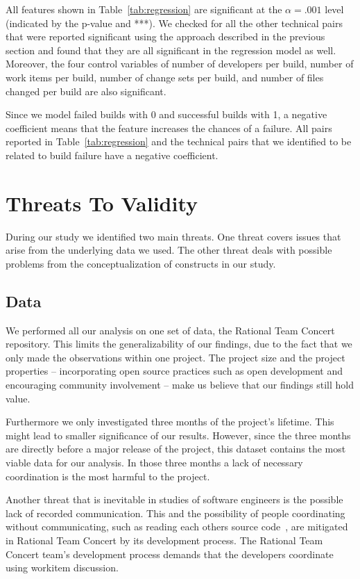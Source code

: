 All features shown in Table~\ref{tab:regression} are significant at the $\alpha=.001$ level (indicated by the p-value and ***).
We checked for all the other technical pairs that were reported significant using the approach described in the previous section and found that they are all significant in the regression model as well.
Moreover, the four control variables of number of developers per build, number
of work items per build, number of change sets per build, and number of files changed per build are also significant.

Since we model failed builds with 0 and successful builds with 1, a negative coefficient means that the feature increases the chances of a failure.
All pairs reported in Table~\ref{tab:regression} and the technical pairs that we identified to be related to build failure have a negative coefficient.
 





\section{Threats To Validity}
\label{sec:threats}
During our study we identified two main threats. 
One threat covers issues that arise from the underlying data we used.
The other threat deals with possible problems from the conceptualization of
constructs in our study.

\subsection{Data}
We performed all our analysis on one set of data, the Rational Team Concert
repository. This limits the generalizability of our findings, due to the fact
that we only made the observations within one project. The  
project size and the project properties -- incorporating open
source practices such as open development and encouraging community involvement
-- make us believe that our findings still hold value.

Furthermore we only investigated three months of the project's lifetime. This
might lead to smaller significance of our results. However, since the three
months are directly before a major release of the project, this dataset contains
the most viable data for our analysis. In those three months a lack of necessary
coordination is the most harmful to the project.

Another threat that is inevitable in studies of software engineers is
the possible lack of recorded communication. This and the possibility of people
coordinating without communicating, such as reading each others source
code~\cite{bolici:stc:2009}, are mitigated in Rational Team Concert by its development process.
The Rational Team Concert team's development process demands that the developers
coordinate using workitem discussion. 


